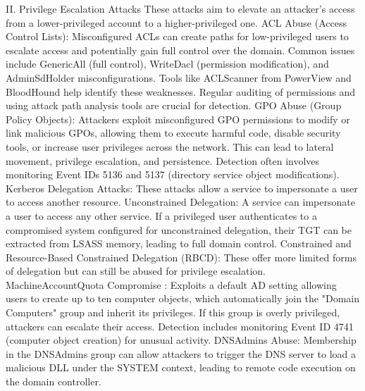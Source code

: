 II. Privilege Escalation Attacks These attacks aim to elevate an attacker's access from a lower-privileged account to a higher-privileged one.
ACL Abuse (Access Control Lists): Misconfigured ACLs can create paths for low-privileged users to escalate access and potentially gain full control over the domain. Common issues include GenericAll (full control), WriteDacl (permission modification), and AdminSdHolder misconfigurations. Tools like ACLScanner from PowerView and BloodHound help identify these weaknesses. Regular auditing of permissions and using attack path analysis tools are crucial for detection.
GPO Abuse (Group Policy Objects): Attackers exploit misconfigured GPO permissions to modify or link malicious GPOs, allowing them to execute harmful code, disable security tools, or increase user privileges across the network. This can lead to lateral movement, privilege escalation, and persistence. Detection often involves monitoring Event IDs 5136 and 5137 (directory service object modifications).
Kerberos Delegation Attacks: These attacks allow a service to impersonate a user to access another resource.
Unconstrained Delegation: A service can impersonate a user to access any other service. If a privileged user authenticates to a compromised system configured for unconstrained delegation, their TGT can be extracted from LSASS memory, leading to full domain control.
Constrained and Resource-Based Constrained Delegation (RBCD):  These offer more limited forms of delegation but can still be abused for privilege escalation.
MachineAccountQuota     Compromise : Exploits a default AD setting allowing users to create up to ten computer objects, which automatically join the "Domain Computers" group and inherit its privileges. If this group is overly privileged, attackers can escalate their access. Detection includes monitoring Event ID 4741 (computer object creation) for unusual activity.
DNSAdmins Abuse:  Membership in the DNSAdmins group can allow attackers to trigger the DNS server to load a malicious DLL under the SYSTEM context, leading to remote code execution on the domain controller.

